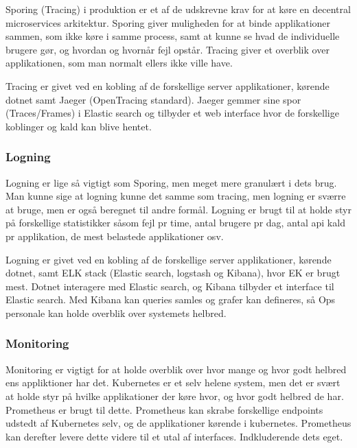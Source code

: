 Sporing (Tracing) i produktion er et af de udskrevne krav for at køre en decentral microservices arkitektur. Sporing giver muligheden for at binde applikationer sammen, som ikke køre i samme process, samt at kunne se hvad de individuelle brugere gør, og hvordan og hvornår fejl opstår. Tracing giver et overblik over applikationen, som man normalt ellers ikke ville have.

Tracing er givet ved en kobling af de forskellige server applikationer, kørende dotnet samt Jaeger (OpenTracing standard). Jaeger gemmer sine spor (Traces/Frames) i Elastic search og tilbyder et web interface hvor de forskellige koblinger og kald kan blive hentet.

\cite{documentation_terms}

\subsubsection{Logning}

Logning er lige så vigtigt som Sporing, men meget mere granulært i dets brug. Man kunne sige at logning kunne det samme som tracing, men logning er sværre at bruge, men er også beregnet til andre formål. Logning er brugt til at holde styr på forskellige statistikker såsom fejl pr time, antal brugere pr dag, antal api kald pr applikation, de mest belastede applikationer osv. 

Logning er givet ved en kobling af de forskellige server applikationer, kørende dotnet, samt ELK stack (Elastic search, logstash og Kibana), hvor EK er brugt mest. Dotnet interagere med Elastic search, og Kibana tilbyder et interface til Elastic search. Med Kibana kan queries samles og grafer kan defineres, så Ops personale kan holde overblik over systemets helbred.

\cite{documentation_terms}

\subsubsection{Monitoring}

Monitoring er vigtigt for at holde overblik over hvor mange og hvor godt helbred ens appliktioner har det. Kubernetes er et selv helene system, men det er svært at holde styr på hvilke applikationer der køre hvor, og hvor godt helbred de har. Prometheus er brugt til dette. Prometheus kan skrabe forskellige endpoints udstedt af Kubernetes selv, og de applikationer kørende i kubernetes. Prometheus kan derefter levere dette videre til et utal af interfaces. Indkluderende dets eget.

